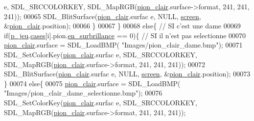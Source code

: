\begin{DoxyCode}
      e, SDL\_SRCCOLORKEY, SDL\_MapRGB(\hyperlink{fonction_interface_8h_ae7267ac64141d082948941a1b51d4df6}{pion_clair}.surface->format, 241, 241, 241));
00065                                                 SDL\_BlitSurface(\hyperlink{fonction_interface_8h_ae7267ac64141d082948941a1b51d4df6}{pion_clair}.surfac
      e, NULL, \hyperlink{fonction_interface_8h_a78fa3957d73de49cb81d047857504218}{screen}, &\hyperlink{fonction_interface_8h_ae7267ac64141d082948941a1b51d4df6}{pion_clair}.position);
00066                                         \}
00067                                 \}
00068                                 \textcolor{keywordflow}{else}\{ \textcolor{comment}{// SI c'est une dame}
00069                                         \textcolor{keywordflow}{if}(\hyperlink{moteur_8h_a3efa8d0f7c65daedc584dc8db048e62c}{p_jeu}.\hyperlink{structplateau_a6afaa60f594542e0d742b0c6d3223392}{cases}[i].pion.\hyperlink{structpion_ae49bb71ca6836b02fd9efa3c1fa64405}{en_surbrillance} ==
       0)\{ \textcolor{comment}{// SI il n'est pas selectionne}
00070                                                 \hyperlink{fonction_interface_8h_ae7267ac64141d082948941a1b51d4df6}{pion_clair}.surface = SDL\_LoadBMP(
      \textcolor{stringliteral}{"Images/pion\_clair\_dame.bmp"});
00071                                                 SDL\_SetColorKey(\hyperlink{fonction_interface_8h_ae7267ac64141d082948941a1b51d4df6}{pion_clair}.surfac
      e, SDL\_SRCCOLORKEY, SDL\_MapRGB(\hyperlink{fonction_interface_8h_ae7267ac64141d082948941a1b51d4df6}{pion_clair}.surface->format, 241, 241, 241));
00072                                                 SDL\_BlitSurface(\hyperlink{fonction_interface_8h_ae7267ac64141d082948941a1b51d4df6}{pion_clair}.surfac
      e, NULL, \hyperlink{fonction_interface_8h_a78fa3957d73de49cb81d047857504218}{screen}, &\hyperlink{fonction_interface_8h_ae7267ac64141d082948941a1b51d4df6}{pion_clair}.position);
00073                                         \}
00074                                         \textcolor{keywordflow}{else}\{
00075                                                 \hyperlink{fonction_interface_8h_ae7267ac64141d082948941a1b51d4df6}{pion_clair}.surface = SDL\_LoadBMP(
      \textcolor{stringliteral}{"Images/pion\_clair\_dame\_selectionne.bmp"});
00076                                                 SDL\_SetColorKey(\hyperlink{fonction_interface_8h_ae7267ac64141d082948941a1b51d4df6}{pion_clair}.surfac
      e, SDL\_SRCCOLORKEY, SDL\_MapRGB(\hyperlink{fonction_interface_8h_ae7267ac64141d082948941a1b51d4df6}{pion_clair}.surface->format, 241, 241, 241));

\end{DoxyCode}
